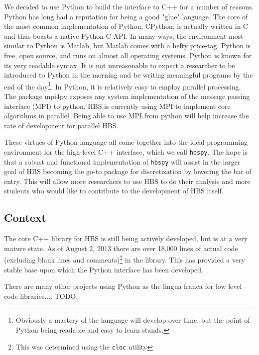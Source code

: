     We decided to use Python to build the interface to C++ for a number of reasons. Python has long had a reputation for being a good "glue" language. The core of the most common implementation of Python, CPython, is actually written in C and thus boasts a native Python-C API. In many ways, the environment most similar to Python is Matlab, but Matlab comes with a hefty price-tag. Python is free, open source, and runs on almost all operating systems. Python is known for its very readable syntax. It is not unreasonable to expect a researcher to be introduced to Python in the morning and be writing meaningful programs by the end of the day\footnote{Obviously a mastery of the language will develop over time, but the point of Python being readable and easy to learn stands.}. In Python, it is relatively easy to employ parallel processing. The package mpi4py exposes any system implementation of the message passing interface (MPI) to python. HBS is currently using MPI to implement core algorithms in parallel. Being able to use MPI from python will help increase the rate of development for parallel HBS.

    These virtues of Python language all come together into the ideal programming environment for the high-level C++ interface, which we call \texttt{hbspy}. The hope is that a robust and functional implementation of \texttt{hbspy} will assist in the larger goal of HBS becoming the go-to package for discretization by lowering the bar of entry. This will allow more researchers to use HBS to do their analysis and more students who would like to contribute to the development of HBS itself.

  \subsection{Context} \label{ssec:context}

    The core C++ library for HBS is still being actively developed, but is at a very mature state. As of August 2, 2013 there are over 18,000 lines of actual code (excluding blank lines and comments)\footnote{This was determined using the \texttt{cloc} utility} in the library. This has provided a very stable base upon which the Python interface has been developed.


    There are many other projects using Python as the lingua franca for low level code libraries.... TODO.


